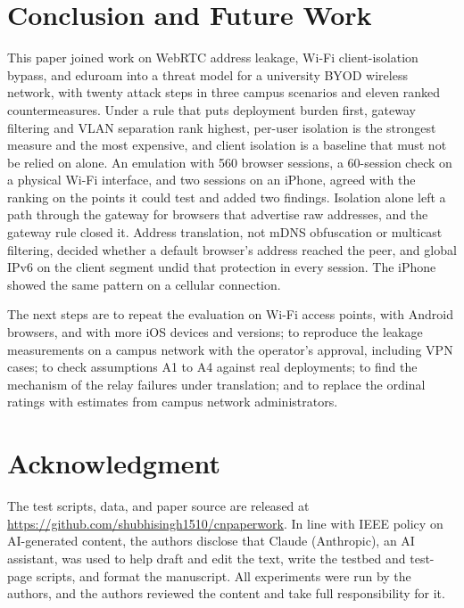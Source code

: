 \documentclass[conference]{IEEEtran}
\begin{document}
\section{Conclusion and Future Work}
\label{sec:conclusion}
This paper joined work on WebRTC address leakage, Wi-Fi client-isolation bypass, and eduroam into a threat model for a university BYOD wireless network, with twenty attack steps in three campus scenarios and eleven ranked countermeasures. Under a rule that puts deployment burden first, gateway filtering and VLAN separation rank highest, per-user isolation is the strongest measure and the most expensive, and client isolation is a baseline that must not be relied on alone. An emulation with 560 browser sessions, a 60-session check on a physical Wi-Fi interface, and two sessions on an iPhone, agreed with the ranking on the points it could test and added two findings. Isolation alone left a path through the gateway for browsers that advertise raw addresses, and the gateway rule closed it. Address translation, not mDNS obfuscation or multicast filtering, decided whether a default browser's address reached the peer, and global IPv6 on the client segment undid that protection in every session. The iPhone showed the same pattern on a cellular connection.

The next steps are to repeat the evaluation on Wi-Fi access points, with Android browsers, and with more iOS devices and versions; to reproduce the leakage measurements on a campus network with the operator's approval, including VPN cases; to check assumptions A1 to A4 against real deployments; to find the mechanism of the relay failures under translation; and to replace the ordinal ratings with estimates from campus network administrators.

\section*{Acknowledgment}
The test scripts, data, and paper source are released at \url{https://github.com/shubhisingh1510/cnpaperwork}. In line with IEEE policy on AI-generated content, the authors disclose that Claude (Anthropic), an AI assistant, was used to help draft and edit the text, write the testbed and test-page scripts, and format the manuscript. All experiments were run by the authors, and the authors reviewed the content and take full responsibility for it.

\balance


\end{document}

